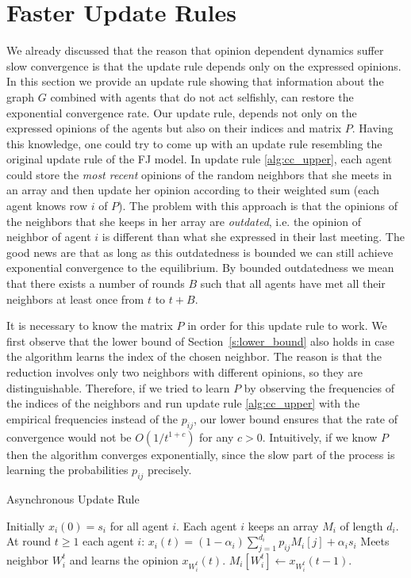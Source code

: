 \section{Faster Update Rules}\label{s:cc_convergence}

We already discussed that the reason that opinion dependent dynamics suffer slow
convergence is that the update rule depends only on the expressed opinions.
In this section we provide an update rule showing that information about the
graph $G$ combined with agents that do not act selfishly, can restore the
exponential convergence rate.
Our update rule, depends not only on the expressed opinions of the
agents but also on their indices and matrix $P$.
Having this knowledge, one could try to come up with an
update rule resembling the original update rule of the FJ model.
In update rule \ref{alg:cc_upper}, each agent could store the
\emph{most recent} opinions of the random neighbors that she meets in an array
and then update her
opinion according to their weighted sum (each agent knows row $i$ of $P$).
The problem with this approach is that the opinions of the neighbors
that she keeps in her array are \emph{outdated}, i.e. the opinion of
neighbor of agent $i$ is different than what she expressed in their
last meeting.  The good news are that as long as this outdatedness
is bounded we can still achieve exponential convergence to the
equilibrium.  By bounded outdatedness we mean that there exists a
number of rounds $B$ such that all agents have met all their neighbors
at least once from $t$ to $t+B$.
\begin{remark}
It is necessary to know the matrix $P$ in order for this
update rule to work. We first observe that the lower bound of
Section~\ref{s:lower_bound} also holds in case the algorithm learns the index
of the chosen neighbor. The reason is that the reduction involves only two neighbors
with different opinions, so they are distinguishable.
Therefore, if we tried to learn $P$ by observing the frequencies
of the indices of the neighbors and run update rule \ref{alg:cc_upper}
with the empirical frequencies instead of the $p_{ij}$, our lower bound
ensures that the rate of convergence would not be $O(1/t^{1+c})$ for any $c>0$.
Intuitively, if we know $P$ then the algorithm converges exponentially,
since the slow part of the process is learning the probabilities $p_{ij}$
precisely.
\end{remark}
\vspace{-5mm}
\begin{algorithm}
  \caption{Asynchronous Update Rule}
  \label{alg:cc_upper}
  \begin{algorithmic}[1]
    \STATE Initially $x_i(0) = s_i$ for all agent $i$.
    \STATE Each agent $i$ keeps an array $M_i$ of length $d_i$.
    \STATE At round $t\geq 1$ each agent $i$:
    \bindent
    \STATE $x_i(t) = (1-\alpha_i)\sum_{j=1}^{d_i} p_{ij} M_i[j] + \alpha_is_i$
    \STATE Meets neighbor $W_i^t$ and learns the opinion $x_{W_i^t}(t)$.
    \STATE $M_i[W_i^t] \gets x_{W_i^t}(t-1)$.
    \eindent
  \end{algorithmic}
\end{algorithm}

